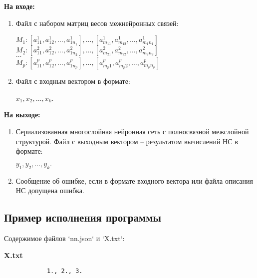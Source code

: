 \documentclass[bachelor, och, report]{shiza}
\begin{document}
        \textbf{На входе:}
            \begin{enumerate}
                \item Файл с набором матриц весов межнейронных связей:
                \begin{center}
                    $M_1 : [a_{11}^1, a_{12}^1, \dots, a_{1n_1}^1], \dots, [a_{m_11}^1, a_{m_12}^1, \dots ,a_{m_1n_1}^1]$ \\
                    $M_2 : [a_{11}^2, a_{12}^2, \dots, a_{1n_2}^2], \dots, [a_{m_21}^2, a_{m_22}^2, \dots ,a_{m_2n_2}^2]$\\
                    $\dots$\\
                    $M_p : [a_{11}^p, a_{12}^p, \dots, a_{1n_p}^p], \dots, [a_{m_p1}^p, a_{m_p2}^p, \dots,a_{m_pn_p}^p]$ \\                  
                \end{center}
                \item Файл с входным вектором в формате:
                \begin{center}
                    $x_1, x_2, \dots, x_k$.
                \end{center}
            \end{enumerate}

        \textbf{На выходе:}
            \begin{enumerate}
                \item Сериализованная многослойная нейронная сеть с полносвязной
                межслойной структурой. Файл с выходным вектором -- результатом
                вычислений НС в формате: 
                \begin{center}
                    $y_1, y_2, \dots, y_k.$                
                \end{center}
                \item Сообщение об ошибке, если в формате входного вектора или
                файла описания НС допущена ошибка.
            \end{enumerate}


    \subsection{Пример исполнения программы}

        Содержимое файлов `nn.json` и `X.txt`:

        \textbf{X.txt}
        \begin{verbatim}
            1., 2., 3.
        \end{verbatim}
        
\end{document}
